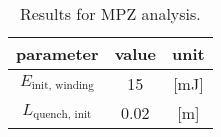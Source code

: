 \begin{table}[H]
    \caption{Results for MPZ analysis.} 
    \vspace{-1.em} 
    \fontsize{10}{10}
    \selectfont 
    \renewcommand{\arraystretch}{1.5}
    \begin{center}
        \begin{tabular}{ ccc }  
        \hline
        parameter & value & unit \\
        \hline
        $E_\text{init, winding}$ & 15 & [mJ] \\
        $L_\text{quench, init}$ & 0.02 & [m] \\
        \hline 
        \end{tabular}
    \end{center}  
     \label{table: mpz_analysis_results} 
 \end{table}